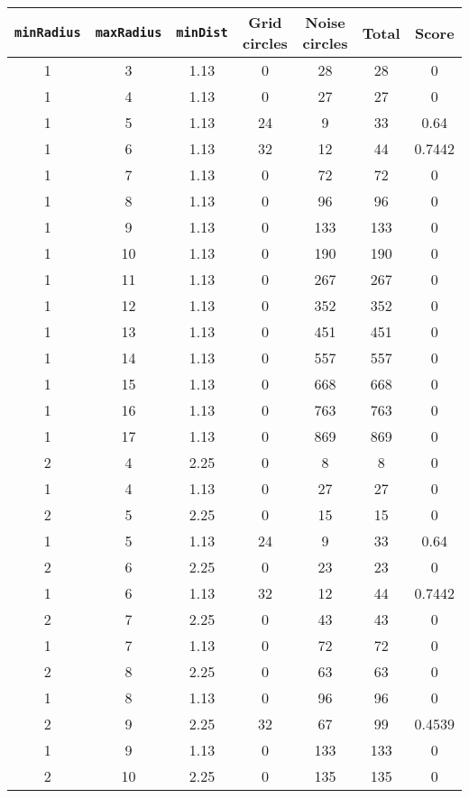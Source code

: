 \documentclass[letterpaper, 12pt]{article}
\begin{document}
\begin{longtable}{|c|c|c|c|c|c|c|}
\hline
\textbf{\texttt{minRadius}} & \textbf{\texttt{maxRadius}} & \textbf{\texttt{minDist}} & \textbf{Grid circles} & \textbf{Noise circles} & \textbf{Total} & \textbf{Score} \\
\hline
1 & 3 & 1.13 & 0 & 28 & 28 & 0 \\
\hline
1 & 4 & 1.13 & 0 & 27 & 27 & 0 \\
\hline
1 & 5 & 1.13 & 24 & 9 & 33 & 0.64 \\
\hline
1 & 6 & 1.13 & 32 & 12 & 44 & 0.7442 \\
\hline
1 & 7 & 1.13 & 0 & 72 & 72 & 0 \\
\hline
1 & 8 & 1.13 & 0 & 96 & 96 & 0 \\
\hline
1 & 9 & 1.13 & 0 & 133 & 133 & 0 \\
\hline
1 & 10 & 1.13 & 0 & 190 & 190 & 0 \\
\hline
1 & 11 & 1.13 & 0 & 267 & 267 & 0 \\
\hline
1 & 12 & 1.13 & 0 & 352 & 352 & 0 \\
\hline
1 & 13 & 1.13 & 0 & 451 & 451 & 0 \\
\hline
1 & 14 & 1.13 & 0 & 557 & 557 & 0 \\
\hline
1 & 15 & 1.13 & 0 & 668 & 668 & 0 \\
\hline
1 & 16 & 1.13 & 0 & 763 & 763 & 0 \\
\hline
1 & 17 & 1.13 & 0 & 869 & 869 & 0 \\
\hline
2 & 4 & 2.25 & 0 & 8 & 8 & 0 \\
\hline
1 & 4 & 1.13 & 0 & 27 & 27 & 0 \\
\hline
2 & 5 & 2.25 & 0 & 15 & 15 & 0 \\
\hline
1 & 5 & 1.13 & 24 & 9 & 33 & 0.64 \\
\hline
2 & 6 & 2.25 & 0 & 23 & 23 & 0 \\
\hline
1 & 6 & 1.13 & 32 & 12 & 44 & 0.7442 \\
\hline
2 & 7 & 2.25 & 0 & 43 & 43 & 0 \\
\hline
1 & 7 & 1.13 & 0 & 72 & 72 & 0 \\
\hline
2 & 8 & 2.25 & 0 & 63 & 63 & 0 \\
\hline
1 & 8 & 1.13 & 0 & 96 & 96 & 0 \\
\hline
2 & 9 & 2.25 & 32 & 67 & 99 & 0.4539 \\
\hline
1 & 9 & 1.13 & 0 & 133 & 133 & 0 \\
\hline
2 & 10 & 2.25 & 0 & 135 & 135 & 0 \\

\end{longtable}
\end{document}
